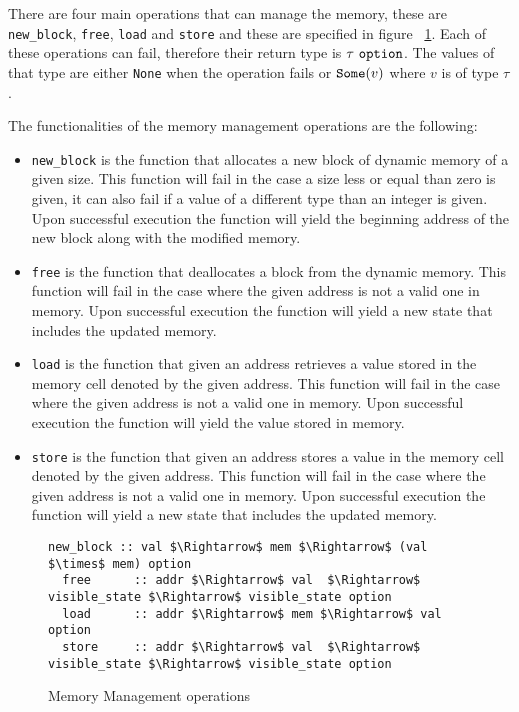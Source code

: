 There are four main operations that can manage the memory, these are \verb|new_block|, \verb|free|, \verb|load| and \verb|store| and these are specified in figure ~\ref{fig:mem_operations}.
Each of these operations can fail, therefore their return type is $\tau\ \verb|option|$.
The values of that type are either \verb|None| when the operation fails or $\verb|Some|(v)$ where $v$ is of type $\tau$.

The functionalities of the memory management operations are the following:

\begin{itemize}
  \item{\verb|new_block| is the function that allocates a new block of dynamic memory of a given size.
  This function will fail in the case a size less or equal than zero is given, it can also fail if a value of a different type than an integer is given.
  Upon successful execution the function will yield the beginning address of the new block along with the modified memory.}
  \item{\verb|free| is the function that deallocates a block from the dynamic memory.
  This function will fail in the case where the given address is not a valid one in memory.
  Upon successful execution the function will yield a new state that includes the updated memory.}
  \item{\verb|load| is the function that given an address retrieves a value stored in the memory cell denoted by the given address.
  This function will fail in the case where the given address is not a valid one in memory.
  Upon successful execution the function will yield the value stored in memory.}
  \item{\verb|store| is the function that given an address stores a value in the memory cell denoted by the given address.
  This function will fail in the case where the given address is not a valid one in memory.
  Upon successful execution the function will yield a new state that includes the updated memory.}
\end{itemize}

\begin{figure}
  \caption{Memory Management operations}
  \label{fig:mem_operations}

  \begin{lstlisting}[mathescape=true, frame=single]
  new_block :: val $\Rightarrow$ mem $\Rightarrow$ (val $\times$ mem) option
  free      :: addr $\Rightarrow$ val  $\Rightarrow$ visible_state $\Rightarrow$ visible_state option
  load      :: addr $\Rightarrow$ mem $\Rightarrow$ val option
  store     :: addr $\Rightarrow$ val  $\Rightarrow$ visible_state $\Rightarrow$ visible_state option
  \end{lstlisting}
\end{figure}


